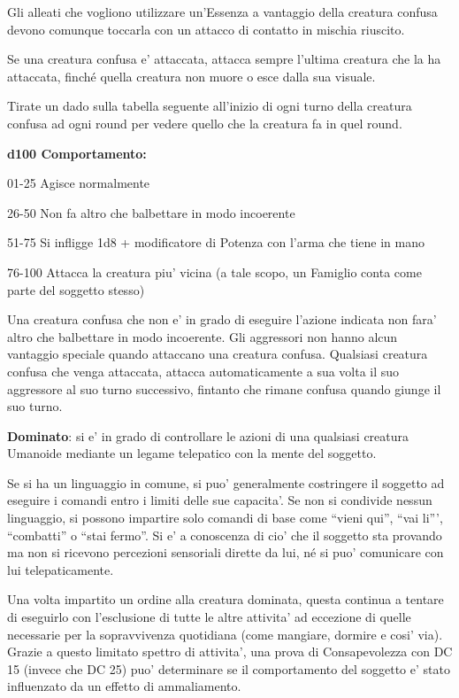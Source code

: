 \documentclass[a4paper,11pt,twoside,openany]{dndbook}
\begin{document}
Gli alleati che vogliono utilizzare un'Essenza a vantaggio della creatura confusa devono comunque toccarla con un attacco di contatto in mischia riuscito.

Se una creatura confusa e' attaccata, attacca sempre l'ultima creatura che la ha attaccata, finché quella creatura non muore o esce dalla sua visuale.

Tirate un dado sulla tabella seguente all'inizio di ogni turno della
creatura confusa ad ogni round per vedere quello che la creatura fa
in quel round.

\textbf{d100 Comportamento:}

01-25 Agisce normalmente

26-50 Non fa altro che balbettare in modo incoerente

51-75 Si infligge 1d8 + modificatore di Potenza con l'arma che tiene in mano

76-100 Attacca la creatura piu' vicina (a tale scopo, un Famiglio conta come parte del soggetto stesso)

Una creatura confusa che non e' in grado di eseguire l'azione indicata non fara' altro che balbettare in modo incoerente. Gli aggressori non hanno alcun vantaggio speciale quando attaccano una creatura confusa. Qualsiasi creatura confusa che venga attaccata, attacca automaticamente a sua volta il suo aggressore al suo turno successivo, fintanto che rimane confusa quando giunge il suo turno.

\textbf{Dominato}: si e' in grado di controllare le azioni di una qualsiasi creatura Umanoide mediante un legame telepatico con la mente del soggetto.

Se si ha un linguaggio in comune, si puo' generalmente costringere il soggetto ad eseguire i comandi entro i limiti delle sue capacita'. Se non si condivide nessun linguaggio, si possono impartire solo comandi di base come ``vieni qui'', ``vai li''', ``combatti'' o ``stai fermo''. Si e' a conoscenza di cio' che il soggetto sta provando ma non si ricevono percezioni sensoriali dirette da lui, né si puo' comunicare con lui telepaticamente.

Una volta impartito un ordine alla creatura dominata, questa continua a tentare di eseguirlo con l'esclusione di tutte le altre attivita' ad eccezione di quelle necessarie per la sopravvivenza quotidiana (come mangiare, dormire e cosi' via). Grazie a questo limitato spettro di attivita', una prova di Consapevolezza con DC 15 (invece che DC 25) puo' determinare se il comportamento del soggetto e' stato influenzato da un effetto di ammaliamento.
\end{document}
